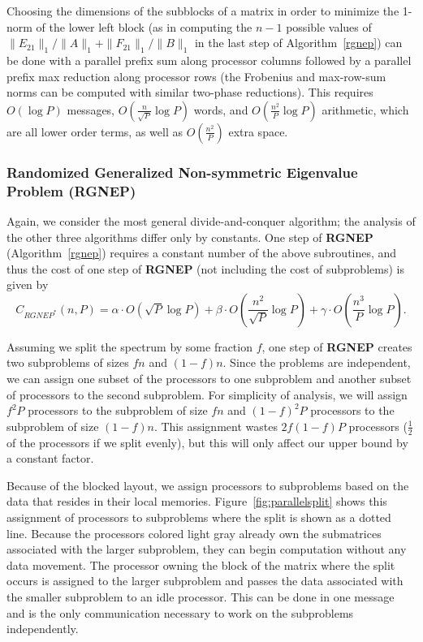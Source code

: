 \documentclass{article}
\def\lt{\left}
\def\rt{\right}
\theoremstyle{definition}
\begin{document}
Choosing the dimensions of the subblocks of a matrix in order to minimize the 1-norm of the lower left block (as in computing the $n-1$ possible values of $\|E_{21}\|_1/\|A\|_1+\|F_{21}\|_1/\|B\|_1$ in the last step of Algorithm~\ref{rgnep}) can be done with a parallel prefix sum along processor columns followed by a parallel prefix max reduction along processor rows (the Frobenius and max-row-sum norms can be computed with similar two-phase reductions).  This requires $O\lt(\log P\rt)$ messages, $O\lt(\frac{n}{\sqrt P}\log P\rt)$ words, and $O\lt(\frac{n^2}{P}\log P\rt)$ arithmetic, which are all lower order terms, as well as $O\lt(\frac{n^2}{P}\rt)$ extra space.

\subsubsection{Randomized Generalized Non-symmetric Eigenvalue Problem (RGNEP)}

Again, we consider the most general divide-and-conquer algorithm; the analysis of the other three algorithms differ only by constants.  One step of {\bf RGNEP} (Algorithm~\ref{rgnep}) requires a constant number of the above subroutines, and thus the cost of one step of {\bf RGNEP} (not including the cost of subproblems) is given by
$$C_{RGNEP^*}(n,P) = \alpha \cdot O\lt( \sqrt P \log P \rt) + \beta \cdot O\lt( \frac{n^2}{\sqrt P} \log P\rt) + \gamma \cdot O\lt( \frac{n^3}{P}\log P  \rt).$$

Assuming we split the spectrum by some fraction $f$, one step of {\bf RGNEP} creates two subproblems of sizes $fn$ and $(1-f)n$.  Since the problems are independent, we can assign one subset of the processors to one subproblem and another subset of processors to the second subproblem.  For simplicity of analysis, we will assign $f^2P$ processors to the subproblem of size $fn$ and $(1-f)^2P$ processors to the subproblem of size $(1-f)n$.  This assignment wastes $2f(1-f)P$ processors ($\frac12$ of the processors if we split evenly), but this will only affect our upper bound by a constant factor.  

Because of the blocked layout, we assign processors to subproblems based on the data that resides in their local memories.  Figure~\ref{fig:parallelsplit} shows this assignment of processors to subproblems where the split is shown as a dotted line.  Because the processors colored light gray already own the submatrices associated with the larger subproblem, they can begin computation without any data movement.  The processor owning the block of the matrix where the split occurs is assigned to the larger subproblem and passes the data associated with the smaller subproblem to an idle processor.  This can be done in one message and is the only communication necessary to work on the subproblems independently.
\end{document}
